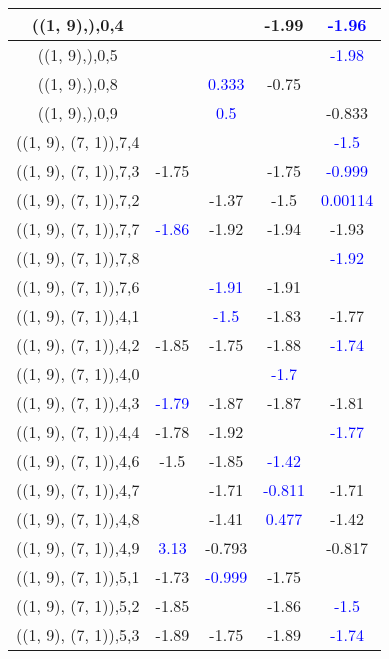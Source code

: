 \documentclass{article}
\begin{document}
\begin{center}
\begin{longtable}{|c|c|c|c|c|}
        	\hline
        	((1, 9),),0,4&&&-1.99& \textcolor{blue}{-1.96}\\
        	\hline
        	((1, 9),),0,5&&&& \textcolor{blue}{-1.98}\\
        	\hline
        	((1, 9),),0,8&& \textcolor{blue}{0.333}&-0.75&\\
        	\hline
        	((1, 9),),0,9&& \textcolor{blue}{0.5}&&-0.833\\
        	\hline
        	((1, 9), (7, 1)),7,4&&&& \textcolor{blue}{-1.5}\\
        	\hline
        	((1, 9), (7, 1)),7,3&-1.75&&-1.75& \textcolor{blue}{-0.999}\\
        	\hline
        	((1, 9), (7, 1)),7,2&&-1.37&-1.5& \textcolor{blue}{0.00114}\\
        	\hline
        	((1, 9), (7, 1)),7,7& \textcolor{blue}{-1.86}&-1.92&-1.94&-1.93\\
        	\hline
        	((1, 9), (7, 1)),7,8&&&& \textcolor{blue}{-1.92}\\
        	\hline
        	((1, 9), (7, 1)),7,6&& \textcolor{blue}{-1.91}&-1.91&\\
        	\hline
        	((1, 9), (7, 1)),4,1&& \textcolor{blue}{-1.5}&-1.83&-1.77\\
        	\hline
        	((1, 9), (7, 1)),4,2&-1.85&-1.75&-1.88& \textcolor{blue}{-1.74}\\
        	\hline
        	((1, 9), (7, 1)),4,0&&& \textcolor{blue}{-1.7}&\\
        	\hline
        	((1, 9), (7, 1)),4,3& \textcolor{blue}{-1.79}&-1.87&-1.87&-1.81\\
        	\hline
        	((1, 9), (7, 1)),4,4&-1.78&-1.92&& \textcolor{blue}{-1.77}\\
        	\hline
        	((1, 9), (7, 1)),4,6&-1.5&-1.85& \textcolor{blue}{-1.42}&\\
        	\hline
        	((1, 9), (7, 1)),4,7&&-1.71& \textcolor{blue}{-0.811}&-1.71\\
        	\hline
        	((1, 9), (7, 1)),4,8&&-1.41& \textcolor{blue}{0.477}&-1.42\\
        	\hline
        	((1, 9), (7, 1)),4,9& \textcolor{blue}{3.13}&-0.793&&-0.817\\
        	\hline
        	((1, 9), (7, 1)),5,1&-1.73& \textcolor{blue}{-0.999}&-1.75&\\
        	\hline
        	((1, 9), (7, 1)),5,2&-1.85&&-1.86& \textcolor{blue}{-1.5}\\
        	\hline
        	((1, 9), (7, 1)),5,3&-1.89&-1.75&-1.89& \textcolor{blue}{-1.74}\\

\end{longtable}
\end{center}
\end{document}
